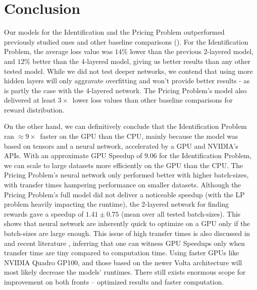 \chapter{Conclusion} \label{sec:Conclusion}
Our models for the Identification and the Pricing Problem outperformed previously studied ones \cite{Xue2016Avi2} and other baseline comparisons (). For the Identification Problem, the average loss value was $14\%$ lower than the previous 2-layered model, and $12\%$ better than the 4-layered model, giving us better results than any other tested model. While we did not test deeper networks, we contend that using more hidden layers will only aggravate overfitting and won't provide better results - as is partly the case with the 4-layered network. The Pricing Problem's model also delivered at least $3\times$~lower loss values than other baseline comparisons for reward distribution.

On the other hand, we can definitively conclude that the Identification Problem ran $\approx 9\times$~faster on the GPU than the CPU, mainly because the model was based on tensors and a neural network, accelerated by a GPU and NVIDIA's APIs. With an approximate GPU Speedup of $9.06$ for the Identification Problem, we can scale to large datasets more efficiently on the GPU than the CPU. The Pricing Problem's neural network only performed better with higher batch-sizes, with transfer times hampering performance on smaller datasets. Although the Pricing Problem's full model did not deliver a noticeable speedup (with the LP problem heavily impacting the runtime), the 2-layered network for finding rewards gave a speedup of $1.41\pm0.75$ (mean over all tested batch-sizes). This shows that neural network are inherently quick to optimize on a GPU only if the batch-sizes are large enough. This issue of high transfer times is also discussed in  and recent literature \cite[Appendix~B]{PattersonARM}, inferring that one can witness GPU Speedups only when transfer time are tiny compared to computation time. Using faster GPUs like NVIDIA Quadro GP100, and those based on the newer Volta architecture will most likely decrease the models' runtimes. There still exists enormous scope for improvement on both fronts -- optimized results and faster computation.

